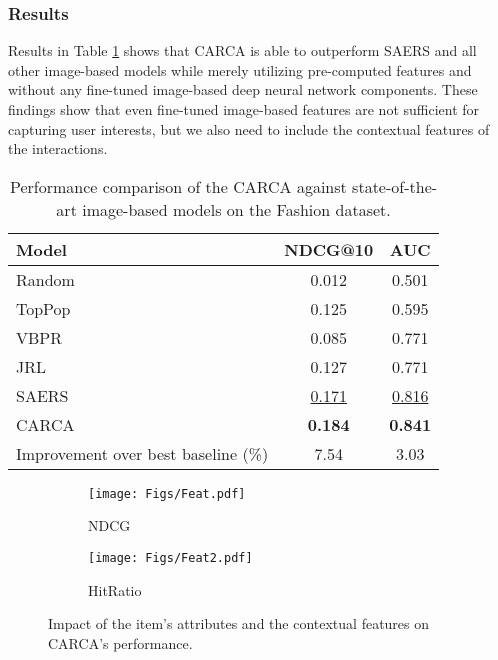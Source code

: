\documentclass[sigconf,natbib=true]{acmart}
\begin{document}
\subsubsection{Results}
Results in Table \ref{Comp2} shows that CARCA is able to outperform SAERS and all other image-based models while merely utilizing pre-computed features and without any fine-tuned image-based deep neural network components. These findings show that even fine-tuned image-based features are not sufficient for capturing user interests, but we also need to include the contextual features of the interactions.
\begin{table}[!ht]
\caption{Performance comparison of the CARCA against state-of-the-art image-based models on the Fashion dataset.}
\label{Comp2}
\small
\begin{center}
\begin{tabular}{lcc}
\toprule

                       Model              & NDCG@10 & AUC   \\
\midrule
Random                                 & 0.012   & 0.501 \\
TopPop                               & 0.125   & 0.595 \\
VBPR \cite{he2016vbpr}                                 & 0.085 & 0.771     \\
JRL  \cite{zhang2017joint}                                & 0.127   & 0.771 \\
SAERS \cite{ijcai2019650}                               & \underline{0.171}   & \underline{0.816} \\
\midrule
CARCA                                  & \textbf{0.184}   & \textbf{0.841} \\
\midrule
\midrule
Improvement over best baseline  (\%) & 7.54    & 3.03 \\
\bottomrule
\end{tabular}
  \end{center}
\end{table}
\begin{figure}[!ht]
\centering
\begin{subfigure}[t]{.235\textwidth}
  \texttt{[image: Figs/Feat.pdf]}
  \caption{NDCG}
  \label{sub1}
\end{subfigure}
\centering
\begin{subfigure}[t]{.235\textwidth}
  \texttt{[image: Figs/Feat2.pdf]}
  \caption{HitRatio}
  \label{sub2}
\end{subfigure}
\caption{Impact of the item's attributes and the contextual features on CARCA's performance.}
\label{feat} 
\end{figure} 
\end{document}
